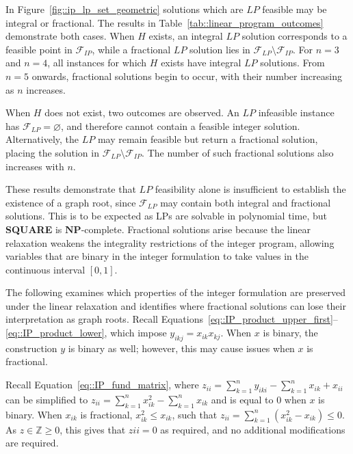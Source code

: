\documentclass[11pt]{report}
\begin{document}


In Figure~\ref{fig::ip_lp_set_geometric} solutions which are $LP$ feasible may be integral or fractional. The results in Table~\ref{tab::linear_program_outcomes} demonstrate both cases. When $H$ exists, an integral $LP$ solution corresponds to a feasible point in $\mathcal{F}_{IP}$, while a fractional $LP$ solution lies in $\mathcal{F}_{LP} \setminus \mathcal{F}_{IP}$. For $n=3$ and $n=4$, all instances for which $H$ exists have integral $LP$ solutions. From $n=5$ onwards, fractional solutions begin to occur, with their number increasing as $n$ increases.

When $H$ does not exist, two outcomes are observed. An $LP$ infeasible instance has $\mathcal{F}_{LP} = \varnothing$, and therefore cannot contain a feasible integer solution. Alternatively, the $LP$ may remain feasible but return a fractional solution, placing the solution in $\mathcal{F}_{LP} \setminus \mathcal{F}_{IP}$. The number of such fractional solutions also increases with $n$. 

These results demonstrate that $LP$ feasibility alone is insufficient to establish the existence of a graph root, since $\mathcal{F}_{LP}$ may contain both integral and fractional solutions. This is to be expected as LPs are solvable in polynomial time, but \textbf{SQUARE} is $\mathbf{NP}$-complete. Fractional solutions arise because the linear relaxation weakens the integrality restrictions of the integer program, allowing variables that are binary in the integer formulation to take values in the continuous interval $[0,1]$.

The following examines which properties of the integer formulation are preserved under the linear relaxation and identifies where fractional solutions can lose their interpretation as graph roots. Recall Equations~\eqref{eq::IP_product_upper_first}--\eqref{eq::IP_product_lower}, which impose $y_{ikj} = x_{ik}x_{kj}$. When $x$ is binary, the construction $y$ is binary as well; however, this may cause issues when $x$ is fractional.

Recall Equation~\eqref{eq::IP_fund_matrix}, where $\displaystyle z_{ii} = \sum_{k = 1}^{n} y_{iki} - \sum_{k = 1}^{n} x_{ik} + x_{ii}$ can be simplified to $\displaystyle z_{ii} = \sum_{k = 1}^{n} x_{ik}^2 - \sum_{k = 1}^{n} x_{ik}$ and is equal to $0$ when $x$ is binary. When $x_{ik}$ is fractional, $x_{ik}^2 \leq x_{ik}$, such that $\displaystyle z_{ii} = \sum_{k = 1}^{n} (x_{ik}^2 - x_{ik}) \leq 0$. As $z \in \mathbb{Z}{\geq 0}$, this gives that $z{ii} = 0$ as required, and no additional modifications are required.
\end{document}
